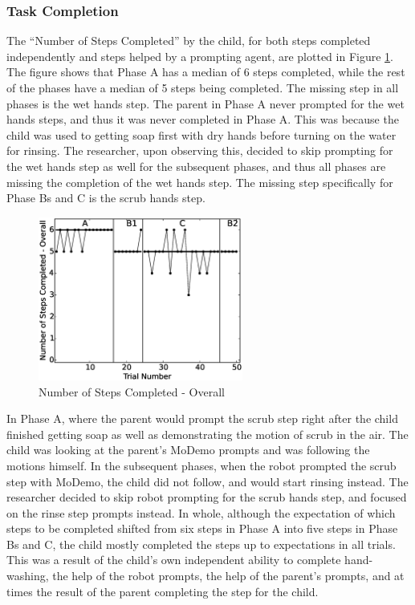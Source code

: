 \subsubsection{Task Completion}
The ``Number of Steps Completed'' by the child, for both steps completed independently and steps helped by a prompting agent, are plotted in Figure \ref{fig:0NumberofStepsCompleted-Overall}.  The figure shows that Phase A has a median of 6 steps completed, while the rest of the phases have a median of 5 steps being completed.  The missing step in all phases is the wet hands step.  The parent in Phase A never prompted for the wet hands steps, and thus it was never completed in Phase A.  This was because the child was used to getting soap first with dry hands before turning on the water for rinsing.  The researcher, upon observing this, decided to skip prompting for the wet hands step as well for the subsequent phases, and thus all phases are missing the completion of the wet hands step.  The missing step specifically for Phase Bs and C is the scrub hands step.
\begin{figure} [h]
	\centering
	\includegraphics[width=0.6\textwidth]{./img/data_analysis/0NumberofStepsCompleted-Overall.eps}
	\caption{Number of Steps Completed - Overall}
	\label{fig:0NumberofStepsCompleted-Overall}
\end{figure}

In Phase A, where the parent would prompt the scrub step right after the child finished getting soap as well as demonstrating the motion of scrub in the air.  The child was looking at the parent's MoDemo prompts and was following the motions himself.  In the subsequent phases, when the robot prompted the scrub step with MoDemo, the child did not follow, and would start rinsing instead.  The researcher decided to skip robot prompting for the scrub hands step, and focused on the rinse step prompts instead.  In whole, although the expectation of which steps to be completed shifted from six steps in Phase A into five steps in Phase Bs and C, the child mostly completed the steps up to expectations in all trials.  This was a result of the child's own independent ability to complete hand-washing, the help of the robot prompts, the help of the parent's prompts, and at times the result of the parent completing the step for the child.



